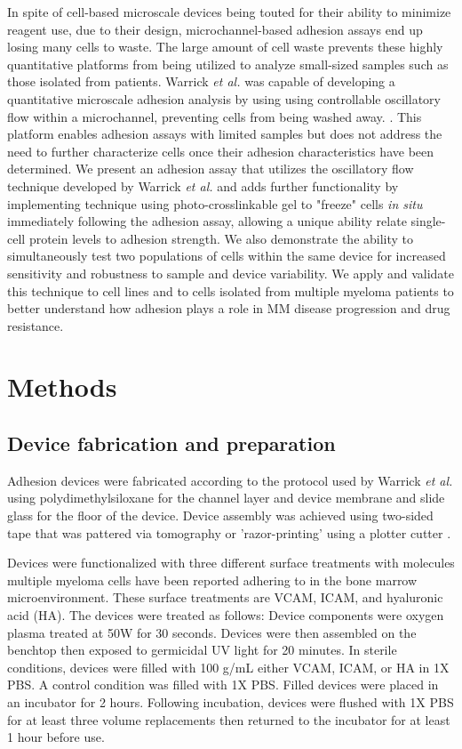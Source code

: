 In spite of cell-based microscale devices being touted for their ability to minimize reagent use, due to their design, microchannel-based adhesion assays end up losing many cells to waste. The large amount of cell waste prevents these highly quantitative platforms from being utilized to analyze small-sized samples such as those isolated from patients. Warrick \textit{et al.} was capable of developing a quantitative microscale adhesion analysis by using using controllable oscillatory flow within a microchannel, preventing cells from being washed away. \cite{Warrick2013}. This platform enables adhesion assays with limited samples but does not address the need to further characterize cells once their adhesion characteristics have been determined. We present an adhesion assay that utilizes the oscillatory flow technique developed by Warrick \textit{et al.} and adds further functionality by implementing technique using photo-crosslinkable gel to "freeze" cells \textit{in situ} immediately following the adhesion assay, allowing a unique ability relate single-cell protein levels to adhesion strength. We also demonstrate the ability to simultaneously test two populations of cells within the same device for increased sensitivity and robustness to sample and device variability. We apply and validate this technique to cell lines and to cells isolated from multiple myeloma patients to better understand how adhesion plays a role in MM disease progression and drug resistance. 

\section{Methods}

\subsection{Device fabrication and preparation}
Adhesion devices were fabricated according to the protocol used by Warrick \textit{et al.} \cite{Warrick2013} using polydimethylsiloxane for the channel layer and device membrane and slide glass for the floor of the device. Device assembly was achieved using two-sided tape that was pattered via tomography or 'razor-printing' using a plotter cutter \cite{Martinez2008a, Kim2009,Bartholomeusz2005}.

Devices were functionalized with three different surface treatments with molecules multiple myeloma cells have been reported adhering to in the bone marrow microenvironment. These surface treatments are VCAM, ICAM, and hyaluronic acid (HA). The devices were treated as follows: Device components were oxygen plasma treated at 50W for 30 seconds. Devices were then assembled on the benchtop then exposed to germicidal UV light for 20 minutes. In sterile conditions, devices were filled with 100 \textmu g/mL either VCAM, ICAM, or HA in 1X PBS. A control condition was filled with 1X PBS. Filled devices were placed in an incubator for 2 hours. Following incubation, devices were flushed with 1X PBS for at least three volume replacements then returned to the incubator for at least 1 hour before use.

